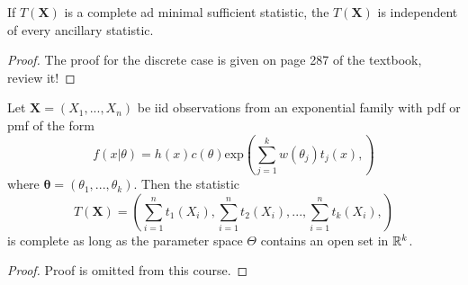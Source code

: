 \begin{theorem}
    If $T(\boldsymbol{X})$ is a complete ad minimal sufficient statistic, the $T(\boldsymbol{X})$ is independent of every ancillary statistic. 
\end{theorem}
\begin{proof}
    The proof for the discrete case is given on page 287 of the textbook, review it!
\end{proof}
\begin{theorem}
    Let $\boldsymbol{X} = (X_1,...,X_n)$ be iid observations from an exponential family with pdf or pmf of the form
    $$
        f(x|\theta) = h(x)c(\theta)\text{exp} \left (
            \sum_{j=1}^{k}w(\theta_j)t_j(x),
        \right) 
    $$
    where $\boldsymbol{\theta} = (\theta_1,...,\theta_k)$. Then the statistic 
    $$
    T(\boldsymbol{X}) = \left (
        \sum_{i=1}^{n}t_1(X_i), \sum_{i=1}^{n}t_2(X_i),...,\sum_{i=1}^{n}t_k(X_i),
    \right )
    $$
    is complete as long as the parameter space $\Theta$ contains an open set in $\mathbb R^k$.
\end{theorem}
\begin{proof}
    Proof is omitted from this course.
\end{proof}
